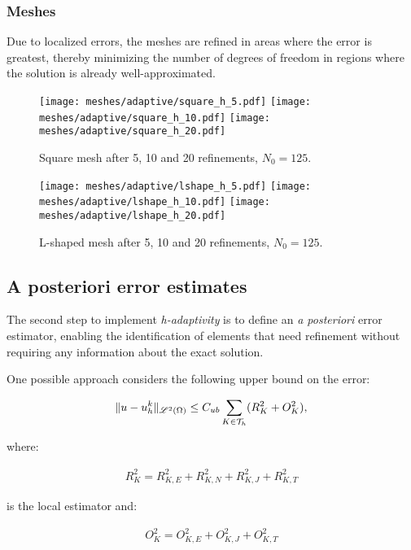 \newpage
\subsubsection{Meshes}

Due to localized errors, the meshes are refined in areas where the error is greatest, thereby minimizing the number of degrees of freedom in regions where the solution is already well-approximated.

\begin{figure}[!ht]
	\centering
	\texttt{[image: meshes/adaptive/square\_h\_5.pdf]}
	\texttt{[image: meshes/adaptive/square\_h\_10.pdf]}
	\texttt{[image: meshes/adaptive/square\_h\_20.pdf]}
	\caption{Square mesh after 5, 10 and 20 refinements, $N_0 = 125$.}
\end{figure}

\begin{figure}[!ht]
	\centering
	\texttt{[image: meshes/adaptive/lshape\_h\_5.pdf]}
	\texttt{[image: meshes/adaptive/lshape\_h\_10.pdf]}
	\texttt{[image: meshes/adaptive/lshape\_h\_20.pdf]}
	\caption{L-shaped mesh after 5, 10 and 20 refinements, $N_0 = 125$.}
\end{figure}

\newpage
\subsection{A posteriori error estimates}

The second step to implement \textit{h-adaptivity} is to define an \textit{a posteriori} error estimator, enabling the identification of elements that need refinement without requiring any information about the exact solution.

\cite{Cangiani2023} One possible approach considers the following upper bound on the error:

\begin{gather}
	\lVert u - u^k_h \rVert_{\mathscr{L}^2(\Omega)} \leq C_{ub} \sum_{K \in \mathcal{T}_h} (R_K^2 + O_K^2),
\end{gather}

where:

\begin{gather}
	R_K^2 = R_{K, E}^2 + R_{K, N}^2 + R_{K, J}^2 + R_{K, T}^2
\end{gather}

is the local estimator and:

\begin{gather}
	O_K^2 = O_{K, E}^2 + O_{K, J}^2 + O_{K, T}^2
\end{gather}

